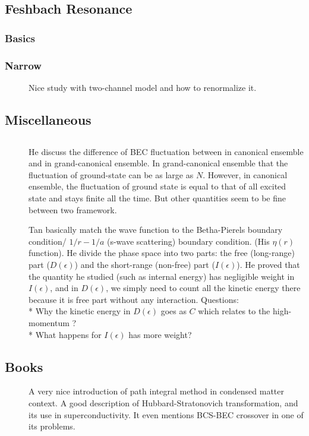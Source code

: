 \subsection{Feshbach Resonance}
\subsubsection{Basics}
\subsubsection{Narrow}
\begin{description}
  \item [\cite{JacksonNarrow}]Nice study with two-channel model and how to renormalize it. 
	
 \end{description}
 
\subsection{Miscellaneous}
\subsection{}
\begin{description}
\item[\cite{Politzer}]He discuss the difference of BEC fluctuation between in canonical ensemble and in grand-canonical ensemble.  In grand-canonical ensemble that the fluctuation of ground-state can be as large as $N$.  However, in canonical ensemble, the fluctuation of ground state is equal to that of all excited state and stays finite all the time.  But other quantities seem to be fine between two framework.  
\item[\cite{Tan2008-1,Tan2008-2}]Tan basically match the wave function to the Betha-Pierels boundary condition/ $1/r-1/a$ (s-wave scattering) boundary condition.  (His $\eta(r)$ function).  He divide the phase space into two parts:  the free (long-range) part ($D(\epsilon)$) and the short-range (non-free) part ($I(\epsilon)$).  He proved that the quantity he studied (such as internal energy) has negligible weight in $I(\epsilon)$, and in $D(\epsilon)$, we simply need to count all the kinetic energy there because it is free part without any interaction.  
Questions:\\
* Why the kinetic energy in $D(\epsilon)$ goes as $C$ which relates to the high-momentum ?\\
* What happens for $I(\epsilon)$ has more weight?
\end{description}

\subsection{Books}
\begin{description}
\item[\cite{Altland}]A very nice introduction of path integral method in condensed matter context.  A good description of Hubbard-Stratonovich transformation, and its use in superconductivity.  It even mentions BCS-BEC crossover in one of its problems. 
\end{description}